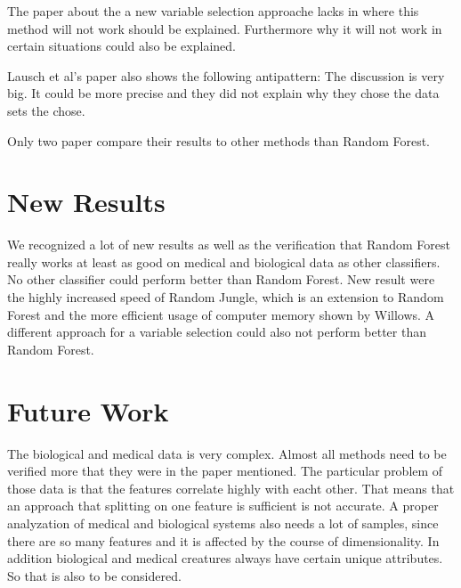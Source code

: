 \documentclass{sig-alternate-05-2015}
\begin{document}
The paper about the a new variable selection approache lacks in where this method will not work should be explained. Furthermore why it will not work in certain situations could also be explained. 

Lausch et al's paper also shows the following antipattern: The discussion is very big. It could be more precise and they did not explain why they chose the data sets the chose. 

Only two paper compare their results to other methods than Random Forest. 

\section{New Results}
We recognized a lot of new results as well as the verification that Random Forest really works at least as good on medical and biological data as other classifiers. No other classifier could perform better than Random Forest. New result were the highly increased speed of Random Jungle, which is an extension to Random Forest and the more efficient usage of computer memory shown by Willows. A different approach for a variable selection could also not perform better than Random Forest. 


\section{Future Work}
The biological and medical data is very complex. Almost all methods need to be verified more that they were in the paper mentioned. The particular problem of those data is that the features correlate highly with eacht other. That means that an approach that splitting on one feature is sufficient is not accurate. A proper analyzation of medical and biological systems also needs a lot of samples, since there are so many features and it is affected by the course of dimensionality. In addition biological and medical creatures always have certain unique attributes. So that is also to be considered.





%

%
%

\end{document}
